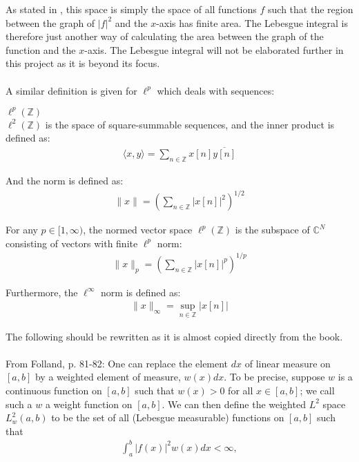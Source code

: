 As stated in \cite{page 74, FAA}, this space is simply the space of all functions $f$ such that the region between the graph of $|f|^2$ and the $x$-axis has finite area. The Lebesgue integral is therefore just another way of calculating the area between the graph of the function and the $x$-axis. The Lebesgue integral will not be elaborated further in this project as it is beyond its focus.
\\ \\
A similar definition is given for $\ell^p$ which deals with sequences:
\begin{definition}{$\ell^p(\mathbb{Z})$}
\\
$\ell^2(\mathbb{Z})$ is the space of square-summable sequences, and the inner product is defined as:
\begin{align*}
\langle x,y \rangle = \sum_{n\in\mathbb{Z}} x[n] \overline{y[n]}
\end{align*}

And the norm is defined as:
\begin{align*}
\|x\| = \left( \sum_{n\in\mathbb{Z}} |x[n]|^2 \right)^{1/2}
\end{align*}

For any $p \in [1,\infty)$, the normed vector space $\ell^p(\mathbb{Z})$ is the subspace of $\mathbb{C}^N$ consisting of vectors with finite $\ell^p$ norm:
\begin{align*}
\|x\|_p = \left( \sum_{n\in\mathbb{Z}} |x[n]|^p \right)^{1/p}
\end{align*}

Furthermore, the $\ell^\infty$ norm is defined as:
\begin{align*}
\|x\|_\infty = \sup_{n\in\mathbb{Z}}|x[n]|
\end{align*}
\end{definition}

The following should be rewritten as it is almost copied directly from the book.
\\ \\
From Folland, p. 81-82:
One can replace the element $dx$ of linear measure on $[a,b]$ by a weighted element of measure, $w(x) dx$. To be precise, suppose $w$ is a continuous function on $[a,b]$ such that $w(x) > 0$ for all $x \in [a,b]$; we call such a $w$ a weight function on $[a,b]$. We can then define the weighted $L^2$ space $L^2_w(a,b)$ to be the set of all (Lebesgue measurable) functions on $[a,b]$ such that
\begin{align*}
\int_a^b |f(x)|^2 w(x) dx < \infty,
\end{align*}

